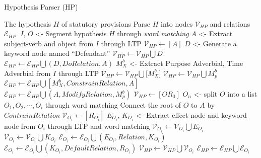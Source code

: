 \begin{algorithm}[!t]
\small
\caption{Hypothesis Parser (HP)}
\label{alg:HP}
\begin{algorithmic}[1]
\Require The hypothesis $H$ of statutory provisions
\Ensure Parse \( H \) into nodes $\mathcal{V}_{HP}$ and relations $\mathcal{E}_{HP}$.
\State $I$, $O$ <- Segment hypothesis $H$ through \textit{word matching} 
\State $A$ <- Extract subject-verb and object from $I$ through LTP
\State $\mathcal{V}_{HP} \gets [A] $
\State $D$ <- Generate a keyword node named ``Defendant''
\State $\mathcal{V}_{HP} \gets \mathcal{V}_{HP} \bigcup D$
\State $\mathcal{E}_{HP} \gets \mathcal{E}_{HP} \bigcup (D, DoRelation, A)$
 
\State \( M^b_X \) <- Extract Purpose Adverbial, Time Adverbial from $I$ through LTP 
\State $\mathcal{V}_{HP} \gets \mathcal{V}_{HP} \bigcup [M^b_X$]
\State $\mathcal{V}_{HP} \gets \mathcal{V}_{HP} \bigcup M^b_p$
\State $\mathcal{E}_{HP} \gets \mathcal{E}_{HP} \bigcup [M^b_X, ConstrainRelation, A]$
\State $\mathcal{E}_{HP} \gets \mathcal{E}_{HP} \bigcup (A, ModifyRelation, M^b_p)$
\EndIf
{}
\State $\mathcal{V}_{HP} \gets [{OR}_0]$ 
\State $O_n$ <- split \( O \) into a list \( O_1, O_2, \cdots, O_i \) through word matching 
\State Connect the root of \( O \) to \( A \) by \(ContrainRelation\)
 
\State $\mathcal{V}_{O_i} \gets [R_{O_i}]$ 
\State $E_{O_i}$, $K_{O_i}$ <- Extract effect node and keyword node from $O_i$ through LTP and word matching
\State $\mathcal{V}_{O_i} \gets \mathcal{V}_{O_i} \bigcup E_{O_i}$
\State $\mathcal{V}_{O_i} \gets \mathcal{V}_{O_i} \bigcup K_{O_i}$
\State $\mathcal{E}_{O_i} \gets \mathcal{E}_{O_i} \bigcup (E_{O_i}, Relation, K_{O_i})$ 
\State $\mathcal{E}_{O_i} \gets \mathcal{E}_{O_i} \bigcup (K_{O_i}, DefaultRelation, R_{O_i})$
\State $\mathcal{V}_{HP} \gets \mathcal{V}_{HP} \bigcup \mathcal{V}_{O_i}$
\State $\mathcal{E}_{HP} \gets \mathcal{E}_{HP} \bigcup \mathcal{E}_{O_i}$
\EndFor
\EndIf
\end{algorithmic}
\end{algorithm}


